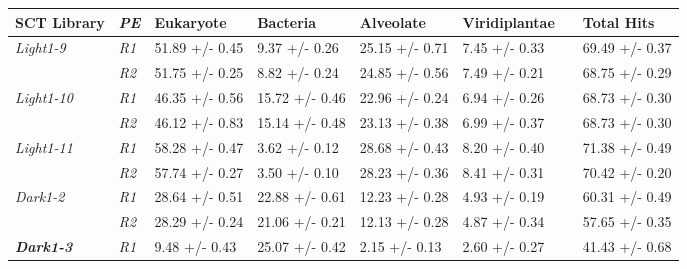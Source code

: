 \begin{table}[h]
     \begin{tabularx}{\textwidth}{|l||l|l|l|l|l|l|l|}
         \hline
         \textbf{SCT Library} & \textit{\textbf{PE}}          & \textbf{Eukaryote} & \textbf{Bacteria} & \textbf{Alveolate} & \textbf{Viridiplantae} &  & \textbf{Total Hits} \\ \cmidrule(r){1-6} \cmidrule(l){8-8} 
         \hline
         \textit{Light1-9}    & \textit{R1}                   & 51.89 +/- 0.45     & 9.37 +/- 0.26     & 25.15 +/-  0.71    & 7.45 +/- 0.33          &  & 69.49 +/- 0.37      \\ \cmidrule(lr){2-2}
                              & \textit{R2}                   & 51.75 +/- 0.25     & 8.82 +/- 0.24     & 24.85 +/- 0.56     & 7.49 +/- 0.21          &  & 68.75 +/- 0.29      \\ \cmidrule(r){1-6} \cmidrule(l){8-8} 
         \textit{Light1-10}   & \textit{R1}                   & 46.35 +/- 0.56     & 15.72 +/- 0.46    & 22.96 +/- 0.24     & 6.94 +/- 0.26          &  & 68.73 +/- 0.30      \\ \cmidrule(lr){2-2}
                              & \textit{R2}                   & 46.12 +/- 0.83     & 15.14 +/- 0.48    & 23.13 +/- 0.38     & 6.99 +/- 0.37          &  & 68.73 +/- 0.30      \\ \cmidrule(r){1-6} \cmidrule(l){8-8} 
         \textit{Light1-11}   & \textit{R1}                   & 58.28 +/- 0.47     & 3.62 +/- 0.12     & 28.68 +/- 0.43     & 8.20 +/- 0.40          &  & 71.38 +/- 0.49      \\ \cmidrule(lr){2-2}
                              & \textit{R2}                   & 57.74 +/- 0.27     & 3.50 +/- 0.10     & 28.23 +/- 0.36     & 8.41 +/- 0.31          &  & 70.42 +/- 0.20      \\ \cmidrule(r){1-6} \cmidrule(l){8-8} 
         \textit{Dark1-2}     & \textit{R1}                   & 28.64 +/- 0.51     & 22.88 +/- 0.61    & 12.23 +/- 0.28     & 4.93 +/- 0.19          &  & 60.31 +/- 0.49      \\ \cmidrule(lr){2-2}
                              & \textit{R2}                   & 28.29 +/- 0.24     & 21.06 +/- 0.21    & 12.13 +/- 0.28     & 4.87 +/- 0.34          &  & 57.65 +/- 0.35      \\ \cmidrule(r){1-6} \cmidrule(l){8-8} 
         \textbf{\textit{Dark1-3}}     & \textit{R1}          & 9.48 +/- 0.43      & 25.07 +/- 0.42    & 2.15 +/- 0.13      & 2.60 +/- 0.27          &  & 41.43 +/- 0.68      \\ \cmidrule(lr){2-2}

\end{tabularx}
\end{table}
